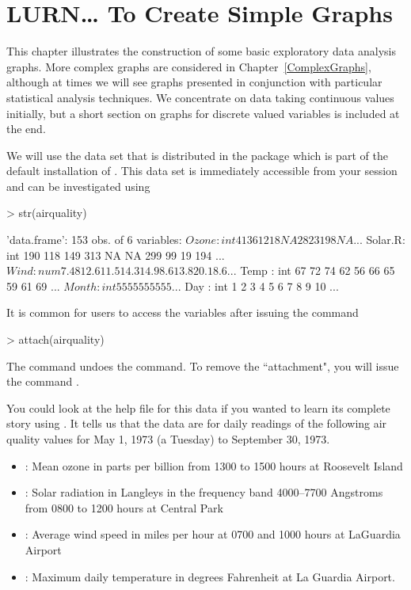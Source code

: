 

\chapter{LURN\ldots{} To Create Simple Graphs} 
\label{SimpleGraphs} 
 
 
 

 
This chapter illustrates the construction of some basic exploratory data analysis graphs. More complex graphs are considered in Chapter~\ref{ComplexGraphs}, although at times we will see graphs presented in conjunction with particular statistical analysis techniques. We concentrate on data taking continuous values initially, but a short section on graphs for discrete valued variables is included at the end. 
 
We will use the  data set that is distributed in the  package which is part of the default installation of \R{}. This data set is immediately accessible from your \R{} session and can be investigated using 
\begin{Schunk}
\begin{Sinput}
> str(airquality) 
\end{Sinput}
\begin{Soutput}
'data.frame':	153 obs. of  6 variables:
 $ Ozone  : int  41 36 12 18 NA 28 23 19 8 NA ...
 $ Solar.R: int  190 118 149 313 NA NA 299 99 19 194 ...
 $ Wind   : num  7.4 8 12.6 11.5 14.3 14.9 8.6 13.8 20.1 8.6 ...
 $ Temp   : int  67 72 74 62 56 66 65 59 61 69 ...
 $ Month  : int  5 5 5 5 5 5 5 5 5 5 ...
 $ Day    : int  1 2 3 4 5 6 7 8 9 10 ...
\end{Soutput}
\end{Schunk}
It is common for \R{} users to access the variables after issuing the command 
\begin{Schunk}
\begin{Sinput}
> attach(airquality) 
\end{Sinput}
\end{Schunk}
The  command undoes the  command. To remove the ``attachment", you will issue the command . 
 
You could look at the help file for this data if you wanted to learn its complete story using . It tells us that the data are for daily readings of the following air quality values for May 1, 1973 (a 
Tuesday) to September 30, 1973. 
\begin{itemize} 
\item {}: Mean ozone in parts per 
billion from 1300 to 1500 hours at Roosevelt Island 
\item {}: Solar radiation 
in Langleys in the frequency band 4000--7700 Angstroms from 
0800 to 1200 hours at Central Park 
\item {}: Average wind speed in miles 
per hour at 0700 and 1000 hours at LaGuardia Airport 
\item {}: Maximum daily 
temperature in degrees Fahrenheit at La Guardia Airport. 
\end{itemize} 
 
